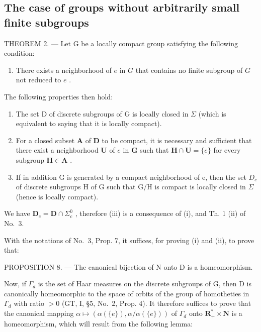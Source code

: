 \subsection{The case of groups without arbitrarily small finite subgroups}

THEOREM 2. --- Let G be a locally compact group satisfying the following condition:

\begin{enumerate}
\def\labelenumi{(\Alph{enumi})}
\setcounter{enumi}{11}
\tightlist
\item
  There exists a neighborhood of \(e\) in \(G\) that contains no finite subgroup of \(G\) not reduced to \(e\) .
\end{enumerate}

The following properties then hold:

\begin{enumerate}
\def\labelenumi{(\roman{enumi})}
\item
  The set D of discrete subgroups of G is locally closed in \(\Sigma\) (which is equivalent to saying that it is locally compact).
\item
  For a closed subset \(\mathbf{A}\) of \(\mathbf{D}\) to be compact, it is necessary and sufficient that there exist a neighborhood \(\mathbf{U}\) of \(e\) in \(\mathbf{G}\) such that \(\mathbf{H} \cap \mathbf{U} = \{e\}\) for every subgroup \(\mathbf{H} \in \mathbf{A}\) .
\item
  If in addition G is generated by a compact neighborhood of e, then the set \(D_{c}\) of discrete subgroups H of G such that G/H is compact is locally closed in \(\Sigma\) (hence is locally compact).
\end{enumerate}

We have \(\mathbf{D}_c = \mathbf{D} \cap \Sigma_c^0\) , therefore (iii) is a consequence of (i), and Th. 1 (ii) of No.~3.

With the notations of No.~3, Prop. 7, it suffices, for proving (i) and (ii), to prove that:

PROPOSITION 8. --- The canonical bijection of N onto D is a homeomorphism.

Now, if \(\Gamma_d\) is the set of Haar measures on the discrete subgroups of G, then D is canonically homeomorphic to the space of orbits of the group of homotheties in \(\Gamma_d\) with ratio \(>0\) (GT, I, §5, No.~2, Prop. 4). It therefore suffices to prove that the canonical mapping \(\alpha \mapsto (\alpha(\{e\}), \alpha/\alpha(\{e\}))\) of \(\Gamma_d\) onto \(\mathbf{R}_+^* \times \mathbf{N}\) is a homeomorphism, which will result from the following lemma:

